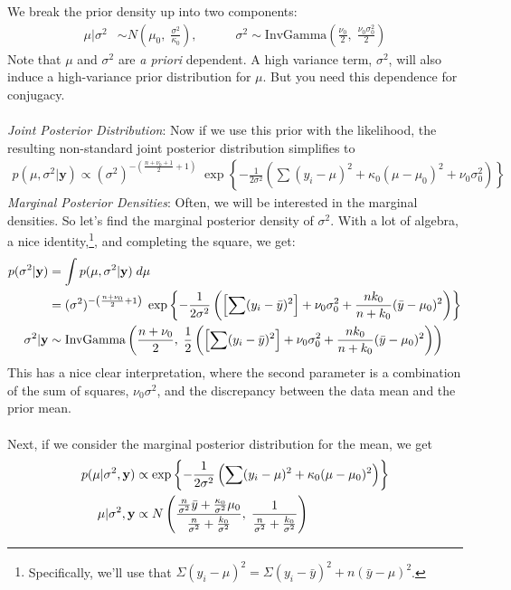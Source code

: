 \documentclass[12pt]{article}
\begin{document}
We break the prior density up into two components:
\begin{align*}
   \mu|\sigma^2 &\sim N\left(\mu_0, \; \frac{\sigma^2}{\kappa_0}
   \right), \qquad \quad
   \sigma^2 \sim \text{InvGamma}\left(\frac{\nu_0}{2},
   \; \frac{\nu_0\sigma^2_0}{2}\right)
\end{align*}
Note that $\mu$ and $\sigma^2$ are \emph{a priori} dependent. A high
variance term, $\sigma^2$, will also induce a high-variance prior
distribution for $\mu$. But you need this dependence for conjugacy.
\\
\\
{\sl Joint Posterior Distribution}:
Now if we use this prior with the likelihood, the resulting non-standard
joint posterior distribution simplifies to
\begin{align*}
   p(\mu, \sigma^2 | \mathbf{y}) \propto (\sigma^2)^{- \left(\frac{
   n+\nu_0+1}{2} + 1\right)} \; \exp \left\{ -\frac{1}{2\sigma^2}
   \left( \sum (y_i-\mu)^2 + \kappa_0 (\mu - \mu_0)^2 + \nu_0\sigma_0^2
   \right) \right\}
\end{align*}
{\sl Marginal Posterior Densities}:
Often, we will be interested in the marginal densities. So let's find
the marginal posterior density of $\sigma^2$. With a lot of algebra, 
a nice identity,\footnote{Specifically, we'll use that $\Sigma 
   (y_i - \mu)^2 = \Sigma  (y_i - \bar{y})^2 + n(\bar{y}-\mu)^2$.}, 
and completing the square, we get:
\begin{align}
   \label{sigpos}
   p(\sigma^2|\mathbf{y})&=\int p(\mu, \sigma^2 | \mathbf{y}) \; d\mu
   \notag\\
   &= (\sigma^2)^{-\left(\frac{n+\nu_0}{2}+1\right)} \;
   \exp\left\{ -\frac{1}{2\sigma^2} \left( \left[\sum (y_i-\bar{y})^2
   \right] +\nu_0 \sigma^2_0 + \frac{nk_0}{n + k_0} (\bar{y}-\mu_0)^2
   \right) \right\}\notag\\
   \sigma^2|\mathbf{y} &\sim \text{InvGamma}\left(\frac{n+\nu_0}{2},
   \; \frac{1}{2} \left(\left[\sum (y_i-\bar{y})^2
   \right] +\nu_0 \sigma^2_0 + \frac{nk_0}{n + k_0} (\bar{y}-\mu_0)^2
   \right)\right) 
\end{align}
This has a nice clear interpretation, where the second parameter is a
combination of the sum of squares, $\nu_0\sigma^2$, and the discrepancy
between the data mean and the prior mean. 
\\
\\
Next, if we consider the
marginal posterior distribution for the mean, we get
\begin{align}
   \label{mupos}
   p(\mu | \sigma^2,\mathbf{y}) &\propto \exp\left\{ -\frac{1}{2\sigma^2}
   \left( \sum (y_i - \mu)^2 + \kappa_0 (\mu-\mu_0)^2\right)\right\}
   \notag\\
   \mu | \sigma^2,\mathbf{y} &\propto N\left( \frac{\frac{n}{\sigma^2}
   \bar{y} + \frac{\kappa_0}{\sigma^2}\mu_0}{\frac{n}{\sigma^2} +
   \frac{k_0}{\sigma^2}}, \; \frac{1}{\frac{n}{\sigma^2} +
   \frac{k_0}{\sigma^2}}\right)
\end{align}
\end{document}
